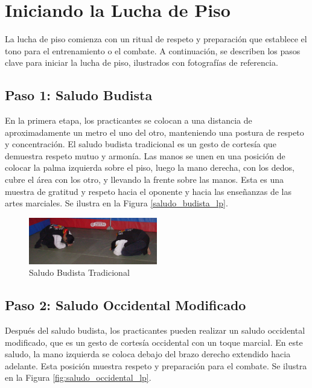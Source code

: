 \section{Iniciando la Lucha de Piso}

La lucha de piso comienza con un ritual de respeto y preparación que establece el tono para el entrenamiento o el combate. A continuación, se describen los pasos clave para iniciar la lucha de piso, ilustrados con fotografías de referencia.

\subsection*{Paso 1: Saludo Budista}

En la primera etapa, los practicantes se colocan a una distancia de aproximadamente un metro el uno del otro, manteniendo una postura de respeto y concentración. El saludo budista tradicional es un gesto de cortesía que demuestra respeto mutuo y armonía. Las manos se unen en una posición de colocar la palma izquierda sobre el piso, luego la mano derecha, con los dedos, cubre el área con los otro, y llevando la frente sobre las manos. Esta es una muestra de gratitud y respeto hacia el oponente y hacia las enseñanzas de las artes marciales. Se ilustra en la Figura \ref{saludo_budista_lp}.

\begin{figure}[h]
	\centering
	\includegraphics[width=0.5\textwidth]{images/Lucha_de_Piso/01_saludo.png}
	\caption{Saludo Budista Tradicional}
	\label{fig:saludo_budista_lp}
\end{figure}

\subsection*{Paso 2: Saludo Occidental Modificado}

Después del saludo budista, los practicantes pueden realizar un saludo occidental modificado, que es un gesto de cortesía occidental con un toque marcial. En este saludo, la mano izquierda se coloca debajo del brazo derecho extendido hacia adelante. Esta posición muestra respeto y preparación para el combate. Se ilustra en la Figura \ref{fig:saludo_occidental_lp}.

